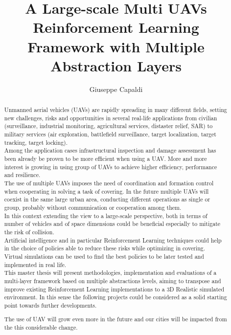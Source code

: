 \documentclass[LaM,binding=0.6cm]{sapthesis}
\title{A Large-scale Multi UAVs Reinforcement Learning Framework with Multiple Abstraction Layers}
\author{Giuseppe Capaldi}
\begin{document}
\frontmatter

\maketitle

\dedication{Dedicated to\\ my family}

\begin{abstract}
Unmanned aerial vehicles (UAVs) are rapidly spreading in many different fields, setting new challenges, risks and opportunities in several real-life applications from civilian (surveillance, industrial monitoring, agricultural services, distaster relief, SAR) to military services (air exploration, battlefield surveillance, target localization, target tracking, target locking)\cite{Shakhatreh_2019}.\\
Among the application cases infrastructural inspection and damage assessment has been already be proven to be more efficient when using a UAV. More and more interest is growing in using group of UAVs to achieve higher efficiency, performance and resilience\cite{sysArch11}\cite{sysArch12}.\\
The use of multiple UAVs imposes the need of coordination and formation control when cooperating in solving a task of covering.
In the future multiple UAVs will coexist in the same large urban area, conducting different operations as single or group, probably without communication or cooperation among them.\\
In this context extending the view to a large-scale perspective, both in terms of number of vehicles and of space dimensions could be beneficial especially to mitigate the risk of collision. \\
Artificial intelligence and in particular Reinforcement Learning techniques could help in the choice of policies able to reduce these risks while optimizing in covering.\\
Virtual simulations can be used to find the best policies to be later tested and implemented in real life. \\
This master thesis will present methodologies, implementation and evaluations of a multi-layer framework based on multiple abstractions levels, aiming to transpose and improve existing Reinforcement Learning implementations to a 3D Realistic simulated environment.
In this sense the following projects could be considered as a solid starting point towards further developments.

The use of UAV will grow even more in the future and our cities will be impacted from the this considerable change.  
\end{abstract}
\end{document}
